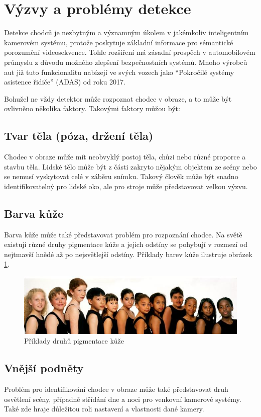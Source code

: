 \section{Výzvy a problémy detekce}
Detekce chodců je nezbytným a významným úkolem v jakémkoliv inteligentním kamerovém systému, protože poskytuje základní informace pro sémantické porozumění videosekvence. Tohle rozšíření má zásadní prospěch v automobilovém průmyslu z důvodu možného zlepšení bezpečnostních systémů. Mnoho výrobců aut již tuto funkcionalitu nabízejí ve svých vozech jako ``Pokročilé systémy asistence řidiče'' (ADAS) od roku 2017.

Bohužel ne vždy detektor může rozpoznat chodce v obraze, a to může být ovlivněno několika faktory. Takovými faktory můžou být:

\subsection{Tvar těla (póza, držení těla)}
Chodec v obraze může mít neobvyklý postoj těla, chůzi nebo různé proporce a stavbu těla. Lidské tělo může být z části zakryto nějakým objektem ze scény nebo se nemusí vyskytovat celé v záběru snímku. Takový člověk může být snadno identifikovatelný pro lidské oko, ale pro stroje může představovat velkou výzvu. 

\subsection{Barva kůže}
Barva kůže může také představovat problém pro rozpoznání chodce. Na světě existují různé druhy pigmentace kůže a jejich odstíny se pohybují v rozmezí od nejtmavší hnědé až po nejsvětlejší odstíny. Příklady barev kůže ilustruje obrázek \ref{colorskin}.

\begin{figure}[H]
\centering
\includegraphics[width=15cm]{figures/colorskin}
\caption{Příklady druhů pigmentace kůže\cite{skincolor:obr}}
\label{colorskin}
\end{figure}

\subsection{Vnější podněty}
Problém pro identifikování chodce v obraze může také představovat druh osvětlení scény, případně střídání dne a noci pro venkovní kamerové systémy. Také zde hraje důležitou roli nastavení a vlastnosti dané kamery. 

